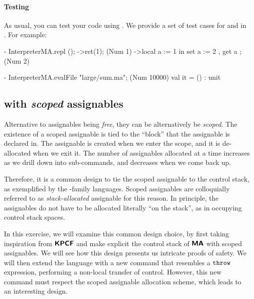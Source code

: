 \documentclass[11pt]{article}
\begin{document}
\paragraph{Testing}
As usual, you can test your code using . We provide a set of test cases for  and  in . For example:
\begin{codeblock}
  - InterpreterMA.repl ();
  ->ret(1);
  (Num 1)
  ->local a := 1 in { set a := 2 , get a };
  (Num 2)

  - InterpreterMA.evalFile "large/sum.ma";
  (Num 10000)
  val it = () : unit
\end{codeblock}


\subsection{\LangMA{} with \emph{scoped} assignables}

Alternative to assignables being \emph{free}, they can be alternatively be \emph{scoped}. The existence of a scoped
assignable is tied to the ``block'' that the assignable is declared in. The assignable is created when we enter the
scope, and it is de-allocated when we exit it. The number of assignables allocated at a time increases as we drill
down into sub-commands, and decreases when we come back up.

Therefore, it is a common design to tie the scoped assignable to the control stack, as exemplified by the
-family languages. Scoped assignables are colloquially referred to as \emph{stack-allocated} assignable for
this reason. In principle, the assignables do not have to be allocated literally ``on the stack'', as in occupying
control stack spaces.

In this exercise, we will examine this common design choice, by first taking inspiration from $\textbf{\textsf{KPCF}}{}$ and make
explicit the control stack of $\textbf{\textsf{MA}}$ with scoped assignables. We will see how this design presents us intricate
proofs of safety. We will then extend the language with a new command that resembles a $\mathtt{throw}$ expression,
performing a non-local transfer of control. However, this new command must respect the scoped assignable allocation
scheme, which leads to an interesting design.
\end{document}
